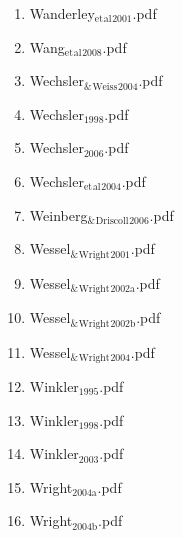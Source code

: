 \documentclass[11pt]{article}
\begin{document}
\begin{enumerate}
\begin{enumerate}
\item Wanderley$_{\text{et}}$$_{\text{al}}$$_{\text{2001}}$.pdf
\label{sec-1-1-1-1-11-19-17-163}

\item Wang$_{\text{et}}$$_{\text{al}}$$_{\text{2008}}$.pdf
\label{sec-1-1-1-1-11-19-17-164}

\item Wechsler$_{\text{\&}}$$_{\text{Weiss}}$$_{\text{2004}}$.pdf
\label{sec-1-1-1-1-11-19-17-165}

\item Wechsler$_{\text{1998}}$.pdf
\label{sec-1-1-1-1-11-19-17-166}

\item Wechsler$_{\text{2006}}$.pdf
\label{sec-1-1-1-1-11-19-17-167}

\item Wechsler$_{\text{et}}$$_{\text{al}}$$_{\text{2004}}$.pdf
\label{sec-1-1-1-1-11-19-17-168}

\item Weinberg$_{\text{\&}}$$_{\text{Driscoll}}$$_{\text{2006}}$.pdf
\label{sec-1-1-1-1-11-19-17-169}

\item Wessel$_{\text{\&}}$$_{\text{Wright}}$$_{\text{2001}}$.pdf
\label{sec-1-1-1-1-11-19-17-170}

\item Wessel$_{\text{\&}}$$_{\text{Wright}}$$_{\text{2002a}}$.pdf
\label{sec-1-1-1-1-11-19-17-171}

\item Wessel$_{\text{\&}}$$_{\text{Wright}}$$_{\text{2002b}}$.pdf
\label{sec-1-1-1-1-11-19-17-172}

\item Wessel$_{\text{\&}}$$_{\text{Wright}}$$_{\text{2004}}$.pdf
\label{sec-1-1-1-1-11-19-17-173}

\item Winkler$_{\text{1995}}$.pdf
\label{sec-1-1-1-1-11-19-17-174}

\item Winkler$_{\text{1998}}$.pdf
\label{sec-1-1-1-1-11-19-17-175}

\item Winkler$_{\text{2003}}$.pdf
\label{sec-1-1-1-1-11-19-17-176}

\item Wright$_{\text{2004a}}$.pdf
\label{sec-1-1-1-1-11-19-17-177}

\item Wright$_{\text{2004b}}$.pdf
\label{sec-1-1-1-1-11-19-17-178}


\end{enumerate}
\end{enumerate}
\end{document}
